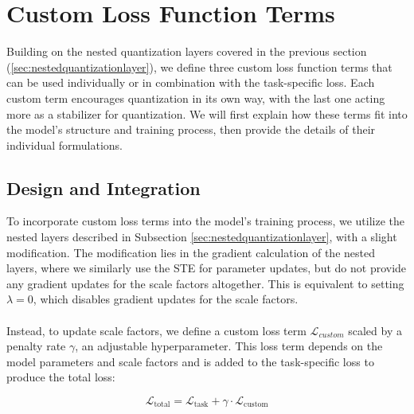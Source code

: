 
\section{Custom Loss Function Terms}
\label{sec:customloss}
Building on the nested quantization layers covered in the previous section (\ref{sec:nestedquantizationlayer}),
we define three custom loss function terms that can be used individually or in combination with the task-specific loss.
Each custom term encourages quantization in its own way,
with the last one acting more as a stabilizer for quantization.
We will first explain how these terms fit into the model's structure and training process,
then provide the details of their individual formulations.

\subsection{Design and Integration}
\label{subsec:designandintegration}
To incorporate custom loss terms into the model's training process,
we utilize the nested layers described in Subsection \ref{sec:nestedquantizationlayer}, with a slight modification.
The modification lies in the gradient calculation of the nested layers,
where we similarly use the STE for parameter updates, but do not provide any gradient updates for the scale factors altogether.
This is equivalent to setting \( \lambda = 0\), which disables gradient updates for the scale factors.
\\
\\
Instead, to update scale factors, we define a custom loss term \( \mathcal{L}_{custom}\) scaled by a penalty rate \( \gamma \),
an adjustable hyperparameter. This loss term depends on the model parameters and scale factors
and is added to the task-specific loss to produce the total loss:

\[
\mathcal{L}_{\text{total}} = \mathcal{L}_{\text{task}} + \gamma \cdot \mathcal{L}_{\text{custom}}
\]


